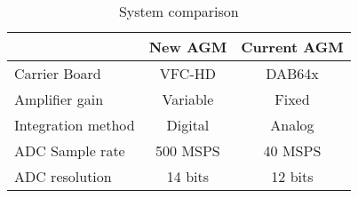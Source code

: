 \begin{table}[!hbt]
   \centering
   \begin{tabular}{ l || c  c }
       \toprule
       & \textbf{New AGM} & \textbf{Current AGM} \\
       \hline
        Carrier Board & VFC-HD & DAB64x \\
        Amplifier gain & Variable & Fixed \\
        Integration method & Digital & Analog \\
        ADC Sample rate & 500 MSPS & 40 MSPS \\
        ADC resolution & 14 bits & 12 bits \\
       \bottomrule
   \end{tabular}
   \caption{System comparison}
   \label{tab:system_comparison}
\end{table}
